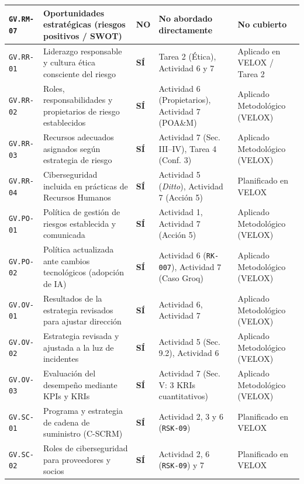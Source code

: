 \documentclass[letterpaper,11pt]{article}
\begin{document}
\begin{longtable}{|C{1.4cm}|L{5.4cm}|C{1.3cm}|L{4.3cm}|C{4.2cm}|}
\hline
\texttt{GV.RM-07} & Oportunidades estratégicas (riesgos positivos / SWOT) & NO & No abordado directamente & No cubierto \\
\hline
\texttt{GV.RR-01} & Liderazgo responsable y cultura ética consciente del riesgo & \textbf{SÍ} & Tarea 2 (Ética), Actividad 6 y 7 & Aplicado en VELOX / Tarea 2 \\
\hline
\texttt{GV.RR-02} & Roles, responsabilidades y propietarios de riesgo establecidos & \textbf{SÍ} & Actividad 6 (Propietarios), Actividad 7 (POA\&M) & Aplicado Metodológico (VELOX) \\
\hline
\texttt{GV.RR-03} & Recursos adecuados asignados según estrategia de riesgo & \textbf{SÍ} & Actividad 7 (Sec. III--IV), Tarea 4 (Conf. 3) & Aplicado Metodológico (VELOX) \\
\hline
\texttt{GV.RR-04} & Ciberseguridad incluida en prácticas de Recursos Humanos & \textbf{SÍ} & Actividad 5 (\textit{Ditto}), Actividad 7 (Acción 5) & Planificado en VELOX \\
\hline
\texttt{GV.PO-01} & Política de gestión de riesgos establecida y comunicada & \textbf{SÍ} & Actividad 1, Actividad 7 (Acción 5) & Aplicado Metodológico (VELOX) \\
\hline
\texttt{GV.PO-02} & Política actualizada ante cambios tecnológicos (adopción de IA) & \textbf{SÍ} & Actividad 6 (\texttt{RK-007}), Actividad 7 (Caso Groq) & Aplicado Metodológico (VELOX) \\
\hline
\texttt{GV.OV-01} & Resultados de la estrategia revisados para ajustar dirección & \textbf{SÍ} & Actividad 6, Actividad 7 & Aplicado Metodológico (VELOX) \\
\hline
\texttt{GV.OV-02} & Estrategia revisada y ajustada a la luz de incidentes & \textbf{SÍ} & Actividad 5 (Sec. 9.2), Actividad 6 & Aplicado Metodológico (VELOX) \\
\hline
\texttt{GV.OV-03} & Evaluación del desempeño mediante KPIs y KRIs & \textbf{SÍ} & Actividad 7 (Sec. V: 3 KRIs cuantitativos) & Aplicado Metodológico (VELOX) \\
\hline
\texttt{GV.SC-01} & Programa y estrategia de cadena de suministro (C-SCRM) & \textbf{SÍ} & Actividad 2, 3 y 6 (\texttt{RSK-09}) & Planificado en VELOX \\
\hline
\texttt{GV.SC-02} & Roles de ciberseguridad para proveedores y socios & \textbf{SÍ} & Actividad 2, 6 (\texttt{RSK-09}) y 7 & Planificado en VELOX \\

\end{longtable}
\end{document}
